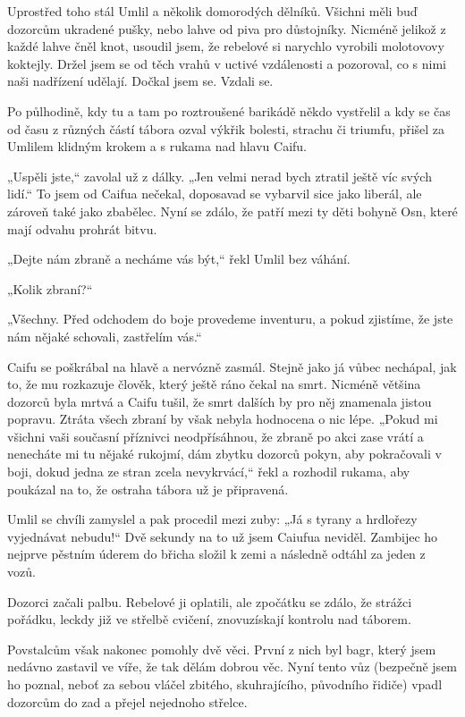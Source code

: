Uprostřed toho stál Umlil a několik domorodých dělníků. Všichni měli buď dozorcům ukradené pušky, nebo lahve od piva pro důstojníky. Nicméně jelikož z každé lahve čněl knot, usoudil jsem, že rebelové si narychlo vyrobili molotovovy koktejly. 
Držel jsem se od těch vrahů v uctivé vzdálenosti a pozoroval, co s nimi naši nadřízení udělají. Dočkal jsem se. Vzdali se.

Po půlhodině, kdy tu a tam po roztroušené barikádě někdo vystřelil a kdy se čas od času z různých částí tábora ozval výkřik bolesti, strachu či triumfu, přišel za Umlilem klidným krokem a s rukama nad hlavu Caifu.

„Uspěli jste,“ zavolal už z dálky. „Jen velmi nerad bych ztratil ještě víc svých lidí.“
To jsem od Caifua nečekal, doposavad se vybarvil sice jako liberál, ale zároveň také jako zbabělec. Nyní se zdálo, že patří mezi ty děti bohyně Osn, které mají odvahu prohrát bitvu.

„Dejte nám zbraně a necháme vás být,“ řekl Umlil bez váhání.

„Kolik zbraní?“

„Všechny. Před odchodem do boje provedeme inventuru, a pokud zjistíme, že jste nám nějaké schovali, zastřelím vás.“

Caifu se poškrábal na hlavě a nervózně zasmál. Stejně jako já vůbec nechápal, jak to, že mu rozkazuje člověk, který ještě ráno čekal na smrt. Nicméně většina dozorců byla mrtvá a Caifu tušil, že smrt dalších by pro něj znamenala jistou popravu. Ztráta všech zbraní by však nebyla hodnocena o nic lépe. „Pokud mi všichni vaši současní příznivci neodpřísáhnou, že zbraně po akci zase vrátí a nenecháte mi tu nějaké rukojmí, dám zbytku dozorců pokyn, aby pokračovali v boji, dokud jedna ze stran zcela nevykrvácí,“ řekl a rozhodil rukama, aby poukázal na to, že ostraha tábora už je připravená.

Umlil se chvíli zamyslel a pak procedil mezi zuby: „Já s tyrany a hrdlořezy vyjednávat nebudu!“ Dvě sekundy na to už jsem Caiufua neviděl. Zambijec ho nejprve pěstním úderem do břicha složil k zemi a následně odtáhl za jeden z vozů.

Dozorci začali palbu. Rebelové ji oplatili, ale zpočátku se zdálo, že strážci pořádku, leckdy již ve střelbě cvičení, znovuzískají kontrolu nad táborem.

Povstalcům však nakonec pomohly dvě věci. První z nich byl bagr, který jsem nedávno zastavil ve víře, že tak dělám dobrou věc. Nyní tento vůz (bezpečně jsem ho poznal, neboť za sebou vláčel zbitého, skuhrajícího, původního řidiče) vpadl dozorcům do zad a přejel nejednoho střelce.

